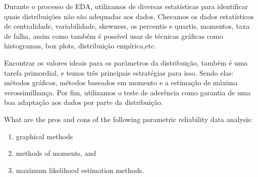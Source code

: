 \documentclass{article}
\begin{document}
Durante o processo de EDA, utilizamos de diversas estatísticas para identificar quais distribuições não são adequadas aos dados. Checamos os dados estatísticos de centralidade, variabilidade, skewness, os percentis e quartis, momentos, taxa de falha, assim como também é possível usar de técnicas gráficas como histogramas, box plots, distribuição empírica,etc.\par

Encontrar os valores ideais para os parâmetros da distribuição, também é uma tarefa primordial, e temos três principais estratégias para isso. Sendo elas: métodos gráficos, métodos baseados em momento e a estimação de máxima verossimilhança.
	Por fim, utilizamos o teste de aderência como garantia de uma boa adaptação aos dados por parte da distribuição.


\setcounter{Question}{6}
\begin{question}
    What are the pros and cons of the following parametric reliability data analysis:
    \begin{enumerate}[label=(\alph*)]
        \item graphical methods

        \item methods of moments, and
        \item  maximum likelihood estimation methods.
    \end{enumerate}
\end{question}
\end{document}
